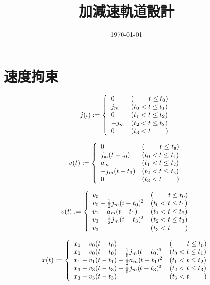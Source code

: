 \documentclass[a5paper]{ltjsarticle}
\title{加減速軌道設計}
\date{\today}
\begin{document}
\maketitle

\section{速度拘束}

$$
    j(t) :=
    \left\{ \begin{array}{ll}
        0    & (\hspace{2.2em}t \le t_0) \\
        j_m  & (t_0 < t \le t_1)         \\
        0    & (t_1 < t \le t_2)         \\
        -j_m & (t_2 < t \le t_3)         \\
        0    & (t_3 < t \hspace{2.2em})
    \end{array} \right.
$$

$$
    a(t) :=
    \left\{ \begin{array}{ll}
        0           & (\hspace{2.2em}t \le t_0) \\
        j_m(t-t_0)  & (t_0 < t \le t_1)         \\
        a_m         & (t_1 < t \le t_2)         \\
        -j_m(t-t_3) & (t_2 < t \le t_3)         \\
        0           & (t_3 < t \hspace{2.2em})
    \end{array} \right.
$$

$$
    v(t) :=
    \left\{ \begin{array}{ll}
        v_0                           & (\hspace{2.2em} t \le t_0) \\
        v_0 + \frac{1}{2}j_m(t-t_0)^2 & (t_0 < t \le t_1)          \\
        v_1 + a_m(t-t_1)              & (t_1 < t \le t_2)          \\
        v_3 - \frac{1}{2}j_m(t-t_3)^2 & (t_2 < t \le t_3)          \\
        v_3                           & (t_3 < t \hspace{2.2em})
    \end{array} \right.
$$

$$
    x(t) :=
    \left\{ \begin{array}{ll}
        x_0 + v_0(t-t_0)                           & (\hspace{2.2em} t \le t_0) \\
        x_0 + v_0(t-t_0) + \frac{1}{6}j_m(t-t_0)^3 & (t_0 < t \le t_1)          \\
        x_1 + v_1(t-t_1) + \frac{1}{2}a_m(t-t_1)^2 & (t_1 < t \le t_2)          \\
        x_3 + v_3(t-t_3) - \frac{1}{6}j_m(t-t_3)^3 & (t_2 < t \le t_3)          \\
        x_3 + v_3(t-t_3)                           & (t_3 < t \hspace{2.2em})
    \end{array} \right.
$$
\end{document}
